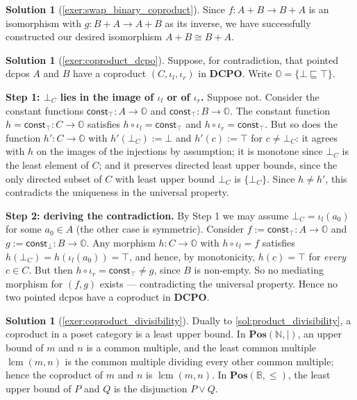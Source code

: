 \documentclass[a4paper,11pt, oneside,titlepage=false]{scrbook}
\theoremstyle{plain}
\theoremstyle{definition}
\newtheorem{solution}[thm]{Solution}
\newcommand{\Catb}[1]{\mathbf{#1}}
\newcommand{\POS}{\Catb{Pos}}
\newcommand{\DCPO}{\Catb{DCPO}}
\newcommand{\inl}{\ensuremath{\iota_l}}
\newcommand{\inr}{\ensuremath{\iota_r}}
\newcommand{\co}[2]{\ensuremath{#2 \circ #1}}
\newcommand{\NN}{\ensuremath{\mathbb{N}}}
\newcommand{\const}{\ensuremath{\mathsf{const}}}
\begin{document}
\begin{solution}[\cref{exer:swap_binary_coproduct}]
\noindent
Since $f : A+B \to B+A$ is an isomorphism with $g : B+A \to A+B$ as its inverse, we have successfully constructed our desired isomorphism $A+B \cong B+A$.
\end{solution}

\begin{solution}[\cref{exer:coproduct_dcpo}]\label{sol:coproduct_dcpo}
  Suppose, for contradiction, that pointed dcpos $A$ and $B$ have a coproduct
  $(C, \inl, \inr)$ in $\DCPO$.
  Write $\mathbb{O} = \{\bot \sqsubseteq \top\}$.

  \textbf{Step 1: $\bot_C$ lies in the image of $\inl$ or of $\inr$.}
  Suppose not.
  Consider the constant functions $\const_\top : A \to \mathbb{O}$ and
  $\const_\top : B \to \mathbb{O}$.
  The constant function $h = \const_\top : C \to \mathbb{O}$ satisfies
  $\co{\inl}{h} = \const_\top$ and $\co{\inr}{h} = \const_\top$.
  But so does the function $h' : C \to \mathbb{O}$ with $h'(\bot_C) := \bot$ and
  $h'(c) := \top$ for $c \neq \bot_C$:
  it agrees with $h$ on the images of the injections by assumption;
  it is monotone since $\bot_C$ is the least element of $C$;
  and it preserves directed least upper bounds, since the only directed subset
  of $C$ with least upper bound $\bot_C$ is $\{\bot_C\}$.
  Since $h \neq h'$, this contradicts the uniqueness in the universal property.

  \textbf{Step 2: deriving the contradiction.}
  By Step 1 we may assume $\bot_C = \inl(a_0)$ for some $a_0 \in A$ (the other
  case is symmetric).
  Consider $f := \const_\top : A \to \mathbb{O}$ and
  $g := \const_\bot : B \to \mathbb{O}$.
  Any morphism $h : C \to \mathbb{O}$ with $\co{\inl}{h} = f$ satisfies
  $h(\bot_C) = h(\inl(a_0)) = \top$, and hence, by monotonicity, $h(c) = \top$
  for \emph{every} $c \in C$.
  But then $\co{\inr}{h} = \const_\top \neq g$, since $B$ is non-empty.
  So no mediating morphism for $(f,g)$ exists --- contradicting the universal
  property.
  Hence no two pointed dcpos have a coproduct in $\DCPO$.
\end{solution}

\begin{solution}[\cref{exer:coproduct_divisibility}]\label{sol:coproduct_divisibility}
  Dually to \cref{sol:product_divisibility}, a coproduct in a poset category is
  a least upper bound.
  In $\POS(\NN,\mid)$, an upper bound of $m$ and $n$ is a common multiple, and
  the least common multiple $\operatorname{lcm}(m,n)$ is the common multiple
  dividing every other common multiple; hence the coproduct of $m$ and $n$ is
  $\operatorname{lcm}(m,n)$.
  In $\POS(\mathbb{B},\leq)$, the least upper bound of $P$ and $Q$ is the
  disjunction $P \vee Q$.
\end{solution}
\end{document}
